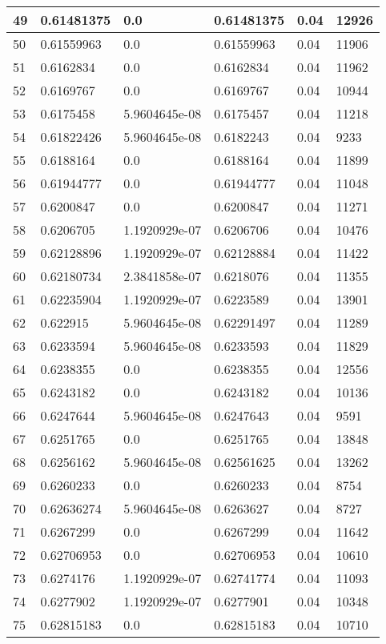 \begin{longtable}{|l|l|l|l|l|l|}
49 & 0.61481375 & 0.0 & 0.61481375 & 0.04 & 12926 \\ \hline 
50 & 0.61559963 & 0.0 & 0.61559963 & 0.04 & 11906 \\ \hline 
51 & 0.6162834 & 0.0 & 0.6162834 & 0.04 & 11962 \\ \hline 
52 & 0.6169767 & 0.0 & 0.6169767 & 0.04 & 10944 \\ \hline 
53 & 0.6175458 & 5.9604645e-08 & 0.6175457 & 0.04 & 11218 \\ \hline 
54 & 0.61822426 & 5.9604645e-08 & 0.6182243 & 0.04 & 9233 \\ \hline 
55 & 0.6188164 & 0.0 & 0.6188164 & 0.04 & 11899 \\ \hline 
56 & 0.61944777 & 0.0 & 0.61944777 & 0.04 & 11048 \\ \hline 
57 & 0.6200847 & 0.0 & 0.6200847 & 0.04 & 11271 \\ \hline 
58 & 0.6206705 & 1.1920929e-07 & 0.6206706 & 0.04 & 10476 \\ \hline 
59 & 0.62128896 & 1.1920929e-07 & 0.62128884 & 0.04 & 11422 \\ \hline 
60 & 0.62180734 & 2.3841858e-07 & 0.6218076 & 0.04 & 11355 \\ \hline 
61 & 0.62235904 & 1.1920929e-07 & 0.6223589 & 0.04 & 13901 \\ \hline 
62 & 0.622915 & 5.9604645e-08 & 0.62291497 & 0.04 & 11289 \\ \hline 
63 & 0.6233594 & 5.9604645e-08 & 0.6233593 & 0.04 & 11829 \\ \hline 
64 & 0.6238355 & 0.0 & 0.6238355 & 0.04 & 12556 \\ \hline 
65 & 0.6243182 & 0.0 & 0.6243182 & 0.04 & 10136 \\ \hline 
66 & 0.6247644 & 5.9604645e-08 & 0.6247643 & 0.04 & 9591 \\ \hline 
67 & 0.6251765 & 0.0 & 0.6251765 & 0.04 & 13848 \\ \hline 
68 & 0.6256162 & 5.9604645e-08 & 0.62561625 & 0.04 & 13262 \\ \hline 
69 & 0.6260233 & 0.0 & 0.6260233 & 0.04 & 8754 \\ \hline 
70 & 0.62636274 & 5.9604645e-08 & 0.6263627 & 0.04 & 8727 \\ \hline 
71 & 0.6267299 & 0.0 & 0.6267299 & 0.04 & 11642 \\ \hline 
72 & 0.62706953 & 0.0 & 0.62706953 & 0.04 & 10610 \\ \hline 
73 & 0.6274176 & 1.1920929e-07 & 0.62741774 & 0.04 & 11093 \\ \hline 
74 & 0.6277902 & 1.1920929e-07 & 0.6277901 & 0.04 & 10348 \\ \hline 
75 & 0.62815183 & 0.0 & 0.62815183 & 0.04 & 10710 \\ \hline 
\end{longtable}